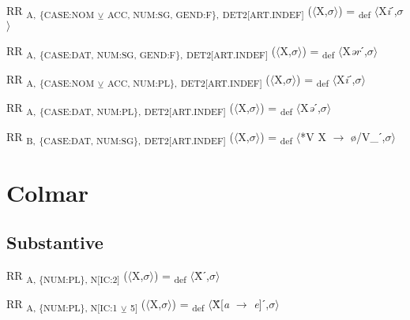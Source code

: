 {\begin{exe}
 RR \textsubscript{A,} \textsubscript{\{CASE:NOM} \textsubscript{${\veebar}$}\textsubscript{ ACC, NUM:SG, GEND:F\},} \textsubscript{DET2[ART.INDEF]} ($\langle$X,$\sigma $$\rangle$) = \textsubscript{def} $\langle$X\textit{i}ˊ,$\sigma $$\rangle$
\end{exe}

\begin{exe}
 RR \textsubscript{A,} \textsubscript{\{CASE:DAT, NUM:SG, GEND:F\},} \textsubscript{DET2[ART.INDEF]} ($\langle$X,$\sigma $$\rangle$) = \textsubscript{def} $\langle$X\textit{ər}ˊ,$\sigma $$\rangle$
\end{exe}

\begin{exe}
 RR \textsubscript{A,} \textsubscript{\{CASE:NOM} \textsubscript{${\veebar}$}\textsubscript{ ACC, NUM:PL\},} \textsubscript{DET2[ART.INDEF]} ($\langle$X,$\sigma $$\rangle$) = \textsubscript{def} $\langle$X\textit{i}ˊ,$\sigma $$\rangle$
\end{exe}

\begin{exe}
 RR \textsubscript{A,} \textsubscript{\{CASE:DAT, NUM:PL\},} \textsubscript{DET2[ART.INDEF]} ($\langle$X,$\sigma $$\rangle$) = \textsubscript{def} $\langle$X\textit{ə}ˊ,$\sigma $$\rangle$
\end{exe}

\begin{exe}
 RR \textsubscript{B,} \textsubscript{\{CASE:DAT, NUM:SG\},} \textsubscript{DET2[ART.INDEF]} ($\langle$X,$\sigma $$\rangle$) = \textsubscript{def} $\langle$*V X $\rightarrow$ ø/V\_ˊ,$\sigma $$\rangle$
\end{exe}

\section{Colmar}

\subsection{Substantive}

\begin{exe}
 RR \textsubscript{A, \{NUM:PL\}, N[IC:2]} ($\langle$X,$\sigma $$\rangle$) = \textsubscript{def} $\langle$Ẍˊ,$\sigma $$\rangle$
\end{exe}

\begin{exe}
 RR \textsubscript{A, \{NUM:PL\}, N[IC:1} \textsubscript{${\veebar}$}\textsubscript{ 5]} ($\langle$X,$\sigma $$\rangle$) = \textsubscript{def} $\langle$Ẍ[\textit{a} $\rightarrow$ \textit{e}]ˊ,$\sigma $$\rangle$
\end{exe}

}
